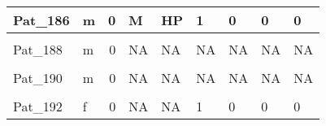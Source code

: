 \documentclass[11pt, a4paper, twosided]{book}
\begin{document}
\begin{longtable}[t]{l|l|r|l|l|l|l|l|l}
\hline
Pat\_186 & m & 0 & M & HP & 1 & 0 & 0 & 0\\
\hline
\cellcolor[HTML]{E2E868}{Pat\_187} & \cellcolor[HTML]{E2E868}{m} & \cellcolor[HTML]{E2E868}{1} & \cellcolor[HTML]{E2E868}{U} & \cellcolor[HTML]{E2E868}{LP} & \cellcolor[HTML]{E2E868}{NA} & \cellcolor[HTML]{E2E868}{NA} & \cellcolor[HTML]{E2E868}{NA} & \cellcolor[HTML]{E2E868}{NA}\\
\hline
Pat\_188 & m & 0 & NA & NA & NA & NA & NA & NA\\
\hline
\cellcolor[HTML]{E2E868}{Pat\_189} & \cellcolor[HTML]{E2E868}{m} & \cellcolor[HTML]{E2E868}{0} & \cellcolor[HTML]{E2E868}{NA} & \cellcolor[HTML]{E2E868}{NA} & \cellcolor[HTML]{E2E868}{NA} & \cellcolor[HTML]{E2E868}{NA} & \cellcolor[HTML]{E2E868}{NA} & \cellcolor[HTML]{E2E868}{NA}\\
\hline
Pat\_190 & m & 0 & NA & NA & NA & NA & NA & NA\\
\hline
\cellcolor[HTML]{E2E868}{Pat\_191} & \cellcolor[HTML]{E2E868}{f} & \cellcolor[HTML]{E2E868}{0} & \cellcolor[HTML]{E2E868}{NA} & \cellcolor[HTML]{E2E868}{NA} & \cellcolor[HTML]{E2E868}{0} & \cellcolor[HTML]{E2E868}{0} & \cellcolor[HTML]{E2E868}{0} & \cellcolor[HTML]{E2E868}{0}\\
\hline
Pat\_192 & f & 0 & NA & NA & 1 & 0 & 0 & 0\\
\hline
\end{longtable}
\endgroup{}
\end{document}

